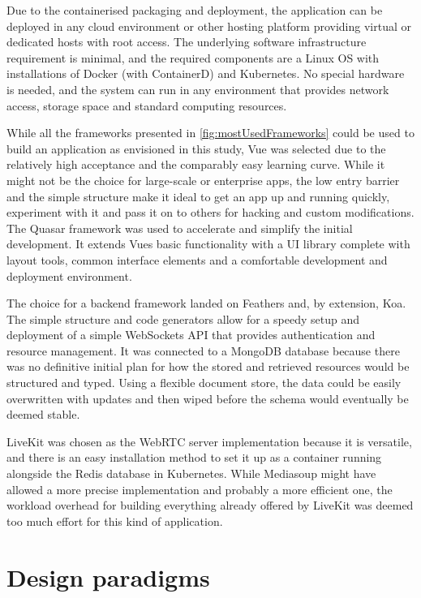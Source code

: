 Due to the containerised packaging and deployment, the application can be deployed in any cloud environment or other hosting platform providing virtual or dedicated hosts with root access.
The underlying software infrastructure requirement is minimal, and the required components are a Linux \ac{OS} with installations of Docker (with ContainerD) and Kubernetes.
No special hardware is needed, and the system can run in any environment that provides network access, storage space and standard computing resources.

While all the frameworks presented in \autoref{fig:mostUsedFrameworks} could be used to build an application as envisioned in this study, Vue was selected due to the relatively high acceptance and the comparably easy learning curve.
While it might not be the choice for large-scale or enterprise apps, the low entry barrier and the simple structure make it ideal to get an app up and running quickly, experiment with it and pass it on to others for hacking and custom modifications.
The Quasar framework was used to accelerate and simplify the initial development. It extends Vue\textquotesingle s basic functionality with a \ac{UI} library complete with layout tools, common interface elements and a comfortable development and deployment environment.

The choice for a backend framework landed on Feathers and, by extension, Koa.
The simple structure and code generators allow for a speedy setup and deployment of a simple WebSockets \ac{API} that provides authentication and resource management.
It was connected to a MongoDB database because there was no definitive initial plan for how the stored and retrieved resources would be structured and typed.
Using a flexible document store, the data could be easily overwritten with updates and then wiped before the schema would eventually be deemed stable.

LiveKit was chosen as the WebRTC server implementation because it is versatile, and there is an easy installation method to set it up as a container running alongside the Redis database in Kubernetes.
While Mediasoup might have allowed a more precise implementation and probably a more efficient one, the workload overhead for building everything already offered by LiveKit was deemed too much effort for this kind of application.

\section{Design paradigms}
\label{sec:design-paradigms}

